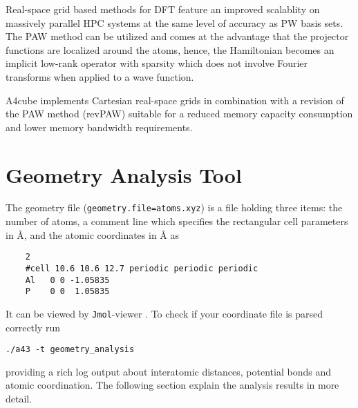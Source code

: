 \documentclass[oribibl]{llncs}
\newcommand{\ttt}[1]{\texttt{#1}}
\newcommand{\codename}{A4cube}
\begin{document}
Real-space grid based methods for \ac{DFT}
feature an improved scalablity on massively parallel \ac{HPC} systems at the same level of accuracy as \ac{PW} basis sets. 
The \ac{PAW} method can be utilized and comes at the advantage that the projector functions are localized around the atoms, 
hence, the Hamiltonian becomes an implicit low-rank operator with sparsity which does not involve Fourier transforms when applied to a wave function.


\codename{} implements Cartesian real-space grids 
in combination with a revision of the \ac{PAW} method (revPAW) suitable for
a reduced memory capacity consumption and lower memory bandwidth requirements.



\section{Geometry Analysis Tool} \label{sec:geometry-analysis}
%
The geometry file (\ttt{geometry.file=atoms.xyz}) is a file
holding three items:
the number of atoms, 
a comment line which specifies the rectangular cell parameters in \AA{}, 
and the atomic coordinates in \AA{} as
\begin{verbatim}
    2
    #cell 10.6 10.6 12.7 periodic periodic periodic
    Al   0 0 -1.05835
    P    0 0  1.05835
\end{verbatim}
It can be viewed by \ttt{Jmol}-viewer \cite{jmol-software}.
%
\noindent
To check if your coordinate file is parsed correctly run
\begin{verbatim}
./a43 -t geometry_analysis
\end{verbatim}
providing a rich log output about interatomic distances,
potential bonds and atomic coordination. The following section
explain the analysis results in more detail.
\end{document}
